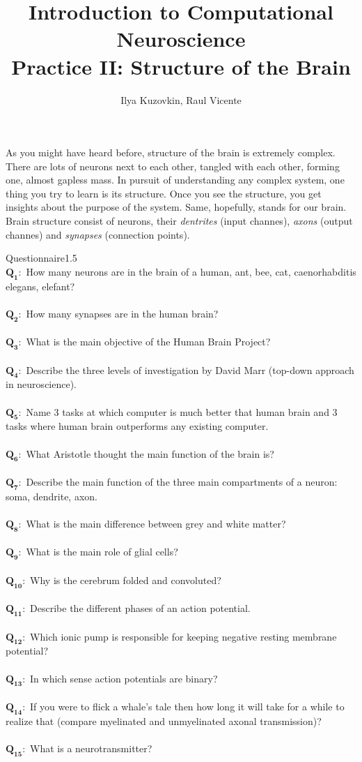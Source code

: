 \documentclass[a4paper,11pt]{article}
\author{\large{Ilya Kuzovkin, Raul Vicente}}
\title{\huge{Introduction to Computational Neuroscience}\\\LARGE{Practice II: Structure of the Brain}}
\newcommand{\question}[2]{\setlength\parindent{0mm}\ \\$\mathbf{Q_{#1}:}$ #2\ \\}
\begin{document}
\maketitle

As you might have heard before, structure of the brain is extremely complex. There are lots of neurons next to each other, tangled with each other, forming one, almost gapless mass. In pursuit of understanding any complex system, one thing you try to learn is its structure. Once you see the structure, you get insights about the purpose of the system. Same, hopefully, stands for our brain. Brain structure consist of neurons, their \emph{dentrites} (input channes), \emph{axons} (output channes) and \emph{synapses} (connection points). 


%
%
\begin{exercise}{1}{Questionnaire}{1.5}
\question{1}{How many neurons are in the brain of a human, ant, bee, cat, caenorhabditis elegans, elefant?}
\question{2}{How many synapses are in the human brain?}
\question{3}{What is the main objective of the Human Brain Project?}
\question{4}{Describe the three levels of investigation by David Marr (top-down approach in neuroscience).}
\question{5}{Name 3 tasks at which computer is much better that human brain and 3 tasks where human brain outperforms any existing computer.}
\question{6}{What Aristotle thought the main function of the brain is?}
\question{7}{Describe the main function of the three main compartments of a neuron: soma, dendrite, axon.}
\question{8}{What is the main difference between grey and white matter?}
\question{9}{What is the main role of glial cells?}
\question{10}{Why is the cerebrum folded and convoluted?}
\question{11}{Describe the different phases of an action potential.}
\question{12}{Which ionic pump is responsible for keeping negative resting membrane potential?}
\question{13}{In which sense action potentials are binary?}
\question{14}{If you were to flick a whale's tale then how long it will take for a while to realize that (compare myelinated and unmyelinated axonal transmission)?}
\question{15}{What is a neurotransmitter?}
\end{exercise}
\end{document}
